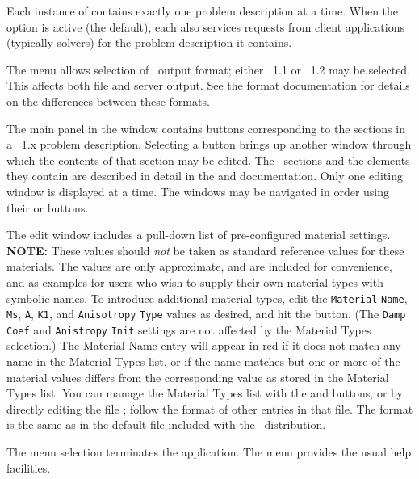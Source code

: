 Each instance of  contains exactly one problem description
at a time.  When the option  is active (the default), each also
services requests from client applications
(typically solvers) for the problem description it contains.

The  menu allows selection of \MIF\ output format; either
\MIF~1.1 or \MIF~1.2 may be selected.  This affects both
 file and  server
output.  See the  format documentation
for details on the differences between these formats.

The main panel in the  window contains buttons
corresponding to the sections in a \MIF~1.x problem description.
Selecting a button brings up another window through which the contents
of that section may be edited.  The \MIF\ sections and the elements they
contain are described in detail in the
 and
 documentation.
Only one editing window is displayed at a time.  The windows may be
navigated in order using their  or
 buttons.

The  edit window includes a pull-down list of
pre-configured material settings.  \textbf{NOTE:} These values should
\textit{not} be taken as standard reference values for these materials.
The values are only approximate, and are included for convenience,
and as examples for users who wish to supply their own material types
with symbolic names.  To introduce additional material types, edit the
\texttt{Material} \texttt{Name}, \texttt{Ms}, \texttt{A}, \texttt{K1}, and
\texttt{Anisotropy} \texttt{Type} values as desired, and hit the 
button.  (The \texttt{Damp} \texttt{Coef} and \texttt{Anistropy}
\texttt{Init} settings are not affected by the Material Types
selection.)  The Material Name entry will appear in red if it does not
match any name in the Material Types list, or if the name matches but
one or more of the material values differs from the corresponding value
as stored in the Material Types list.  You can manage the Material Types
list with the  and  buttons, or by directly
editing the file ; follow the format
of other entries in that file.  The format is the same as in the default
 file included with the \OOMMF\ distribution.

The menu selection  terminates the
 application.  The menu  provides
the usual help facilities.

